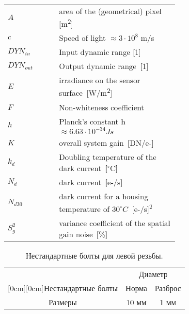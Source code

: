 \documentclass[a4paper,12pt]{report} %
\begin{document}
  \begin{longtable}[h]{lp{0.7\linewidth}}
    $A$ & area of the (geometrical) pixel [m\textsuperscript2] \\
    $c$ & Speed of light $\approx 3 \cdot 10^8$ m/s \\
    $DYN_{in}$ & Input dynamic range [1] \\
    $DYN_{out}$ & Output dynamic range~[1] \\
    $E$ & irradiance on the sensor surface~[W/m\textsuperscript2] \\
    $F$ & Non-whiteness coefficient \\ 
    $h$ & Planck's constant h $\approx6.63 \cdot 10^{-34} Js$ \\
    $K$ & overall system gain~[DN/e-] \\
    $k_d$ & Doubling temperature of the dark current~[$^\circ$C] \\
    $N_d$ & dark current~[e-/s] \\
    $N_{d30}$ & dark current for a housing temperature of $30^\circ C$~[e-/s]\textsuperscript2 \\
    $S_g^2$ & variance coefficient of the spatial gain noise~[\%] \\
  \end{longtable}
  \begin{table}[H]
  \caption{\label{tab:bolts} Нестандартные болты для левой резьбы.}
  \begin{center}
  \begin{tabular}{|c|c|c|}
  \hline
  & \multicolumn{2}{c|}{Диаметр} \\
  \cline{2-3}
  \raisebox{1.5ex}[0cm][0cm]{Нестандартные болты}
  & Норма & Разброс \\
  \hline
  Размеры & 10 мм & 1 мм \\
  \hline
  \end{tabular}
  \end{center}
  \end{table}
\end{document}
